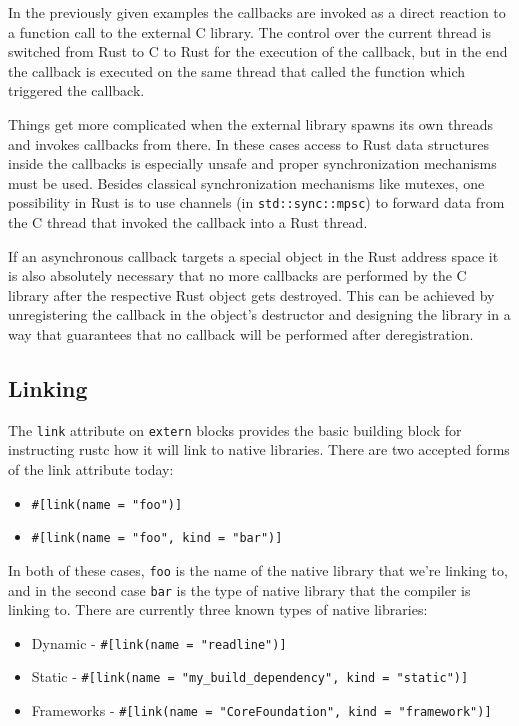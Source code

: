 \documentclass[a4paper,]{book}
\providecommand{\tightlist}{%
  \setlength{\itemsep}{0pt}\setlength{\parskip}{0pt}}
\begin{document}
In the previously given examples the callbacks are invoked as a direct
reaction to a function call to the external C library. The control over
the current thread is switched from Rust to C to Rust for the execution
of the callback, but in the end the callback is executed on the same
thread that called the function which triggered the callback.

Things get more complicated when the external library spawns its own
threads and invokes callbacks from there. In these cases access to Rust
data structures inside the callbacks is especially unsafe and proper
synchronization mechanisms must be used. Besides classical
synchronization mechanisms like mutexes, one possibility in Rust is to
use channels (in \texttt{std::sync::mpsc}) to forward data from the C
thread that invoked the callback into a Rust thread.

If an asynchronous callback targets a special object in the Rust address
space it is also absolutely necessary that no more callbacks are
performed by the C library after the respective Rust object gets
destroyed. This can be achieved by unregistering the callback in the
object's destructor and designing the library in a way that guarantees
that no callback will be performed after deregistration.

\subsection{Linking}\label{linking}

The \texttt{link} attribute on \texttt{extern} blocks provides the basic
building block for instructing rustc how it will link to native
libraries. There are two accepted forms of the link attribute today:

\begin{itemize}
\tightlist
\item
  \texttt{\#{[}link(name\ =\ "foo"){]}}
\item
  \texttt{\#{[}link(name\ =\ "foo",\ kind\ =\ "bar"){]}}
\end{itemize}

In both of these cases, \texttt{foo} is the name of the native library
that we're linking to, and in the second case \texttt{bar} is the type
of native library that the compiler is linking to. There are currently
three known types of native libraries:

\begin{itemize}
\tightlist
\item
  Dynamic - \texttt{\#{[}link(name\ =\ "readline"){]}}
\item
  Static -
  \texttt{\#{[}link(name\ =\ "my\_build\_dependency",\ kind\ =\ "static"){]}}
\item
  Frameworks -
  \texttt{\#{[}link(name\ =\ "CoreFoundation",\ kind\ =\ "framework"){]}}
\end{itemize}
\end{document}
